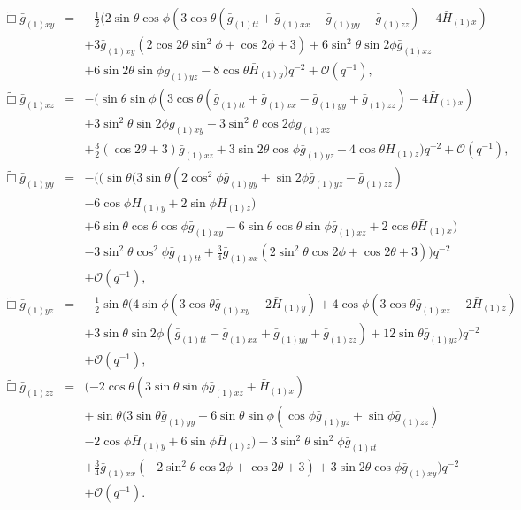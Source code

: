 \documentclass[a4paper,11pt]{article}
\begin{document}
\begin{eqnarray}
%
\label{eqn:efexy}
\tilde{\Box}\bar{g}_{(1)xy}&=&-\frac{1}{2} (2 \sin \theta  \cos \phi  (3 \cos \theta (\bar{g}_{(1)tt}+\bar{g}_{(1)xx}+\bar{g}_{(1)yy}-\bar{g}_{(1)zz})-4 \bar{H}_{(1) x}) \nonumber \\
&&+3 \bar{g}_{(1)xy} (2 \cos 2\theta  \sin ^2\phi +\cos 2 \phi +3)+6 \sin ^2\theta  \sin 2 \phi 
   \bar{g}_{(1)xz} \nonumber \\
   &&+6 \sin 2 \theta  \sin \phi  \bar{g}_{(1)yz}-8 \cos
   \theta  \bar{H}_{(1) y})    q^{-2} +\mathcal{O}(q^{-1}),\\
%
\label{eqn:efexz}
\tilde{\Box}\bar{g}_{(1)xz}&=&- (\sin \theta  \sin \phi  (3 \cos \theta  (\bar{g}_{(1)tt}+\bar{g}_{(1)xx}-\bar{g}_{(1)yy}+\bar{g}_{(1)zz})-4
   \bar{H}_{(1) x}) \nonumber \\
   &&+3 \sin ^2\theta \sin 2 \phi  \bar{g}_{(1)xy}-3 \sin
   ^2\theta  \cos 2 \phi  \bar{g}_{(1)xz} \nonumber \\
   &&+\frac{3}{2} (\cos 2 \theta +3)
   \bar{g}_{(1)xz}+3 \sin 2 \theta  \cos \phi  \bar{g}_{(1)yz}-4 \cos
   \theta  \bar{H}_{(1)z})    q^{-2} +\mathcal{O}(q^{-1}),\\
%
\label{eqn:efeyy}
\tilde{\Box}\bar{g}_{(1)yy}&=&-( (\sin \theta (3 \sin \theta  (2 \cos ^2\phi  \bar{g}_{(1)yy}+\sin 2 \phi  \bar{g}_{(1)yz}-\bar{g}_{(1)zz}) \nonumber \\
&&-6 \cos\phi \bar{H}_{(1) y}+2 \sin \phi  \bar{H}_{(1) z}) \nonumber \\
&&+6 \sin \theta \cos
   \theta \cos \phi  \bar{g}_{(1)xy}-6 \sin \theta  \cos \theta  \sin   \phi  \bar{g}_{(1)xz}+2 \cos \theta  \bar{H}_{(1) x}) \nonumber \\
   &&-3 \sin ^2\theta \cos ^2\phi  \bar{g}_{(1)tt}+\frac{3}{4} \bar{g}_{(1)xx} (2 \sin ^2\theta  \cos 2 \phi +\cos 2 \theta +3)  )  q^{-2} \nonumber \\
&&+\mathcal{O}(q^{-1}),\\
%
\label{eqn:efeyz}
\tilde{\Box}\bar{g}_{(1)yz}&=&-\frac{1}{2} \sin \theta (4 \sin \phi  (3 \cos \theta  \bar{g}_{(1)xy}-2 \bar{H}_{(1) y})+4 \cos \phi  (3 \cos \theta  \bar{g}_{(1)xz}-2 \bar{H}_{(1) z}) \nonumber \\
&&+3 \sin \theta  \sin 2 \phi  (\bar{g}_{(1)tt}-\bar{g}_{(1)xx}+\bar{g}_{(1)yy}+\bar{g}_{(1)zz})+12 \sin \theta  \bar{g}_{(1)yz})  q^{-2} \nonumber \\
&&+\mathcal{O}(q^{-1}),\\
%
\label{eqn:efezz}
\tilde{\Box}\bar{g}_{(1)zz}&=&(-2 \cos \theta  (3 \sin \theta  \sin \phi  \bar{g}_{(1)xz}+\bar{H}_{(1)x}) \nonumber \\
&&+ \sin \theta  (3 \sin \theta  \bar{g}_{(1)yy}-6 \sin\theta  \sin \phi  (\cos \phi  \bar{g}_{(1)yz}+\sin \phi 
   \bar{g}_{(1)zz}) \nonumber \\
   &&-2 \cos \phi  \bar{H}_{(1) y} +6 \sin \phi  \bar{H}_{(1)z}) -3  \sin ^2\theta  \sin ^2\phi  \bar{g}_{(1)tt} \nonumber \\
   &&+\frac{3}{4}  \bar{g}_{(1)xx} (-2 \sin ^2\theta  \cos 2 \phi +\cos 2 \theta
   +3) +3 \sin 2 \theta  \cos \phi  \bar{g}_{(1)xy})  q^{-2} \nonumber \\
&&+\mathcal{O}(q^{-1}).
\end{eqnarray}
\end{document}
